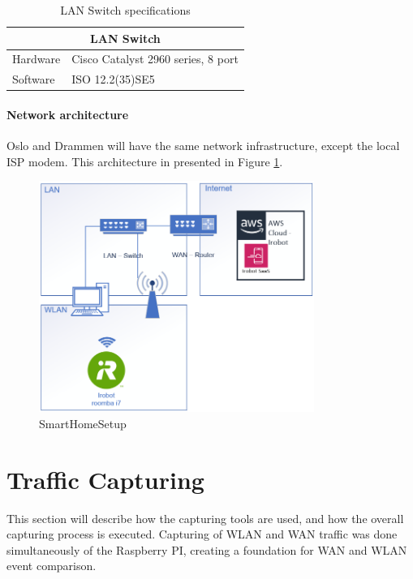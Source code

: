 \begin{table}[H]
\centering
\caption{LAN Switch specifications}
\label{tab:LanSwitchSpec}
\begin{tabular}{|ll|}
\hline
\multicolumn{2}{|c|}{\textbf{LAN Switch}}                           \\ \hline
\multicolumn{1}{|l|}{Hardware} & Cisco Catalyst 2960 series, 8 port \\ \hline
\multicolumn{1}{|l|}{Software} & ISO 12.2(35)SE5                    \\ \hline
\end{tabular}
\end{table}


\paragraph{Network architecture}
Oslo and Drammen will have the same network infrastructure, except the local ISP modem. This architecture in presented in Figure \ref{fig:SmartHomeSetup}. 

\begin{figure}[H]
    \centering
    \includegraphics[width=0.8\textwidth]{figures/SmartHomeSetup.png}
    \caption{SmartHomeSetup}
    \label{fig:SmartHomeSetup}
\end{figure}






\section{Traffic Capturing}
This section will describe how the capturing tools are used, and how the overall capturing process is executed. Capturing of WLAN and WAN traffic was done simultaneously of the Raspberry PI, creating a foundation for WAN and WLAN event comparison. 

